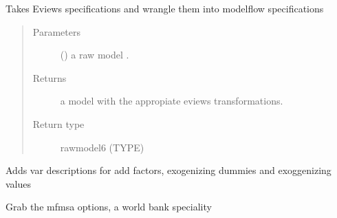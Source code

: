 \documentclass[letterpaper,10pt,english]{sphinxmanual}
\begin{document}
\begin{fulllineitems}

\begin{fulllineitems}
\label{\detokenize{onboard/modelgrabwf2:modelgrabwf2.GrabWfModel.trans_eviews}}
\pysigstartsignatures
{}
\pysigstopsignatures
\sphinxAtStartPar
Takes Eviews specifications and wrangle them into modelflow specifications
\begin{quote}\begin{description}
\item[{Parameters}] \leavevmode
\sphinxAtStartPar
{} () \textendash{} a raw model .

\item[{Returns}] \leavevmode
\sphinxAtStartPar
a model with the appropiate eviews transformations.

\item[{Return type}] \leavevmode
\sphinxAtStartPar
rawmodel6 (TYPE)

\end{description}\end{quote}

\end{fulllineitems}


\begin{fulllineitems}
\label{\detokenize{onboard/modelgrabwf2:modelgrabwf2.GrabWfModel.var_description}}
\pysigstartsignatures
{}
\pysigstopsignatures
\sphinxAtStartPar
Adds var descriptions for add factors, exogenizing dummies and exoggenizing values

\end{fulllineitems}


\begin{fulllineitems}
\label{\detokenize{onboard/modelgrabwf2:modelgrabwf2.GrabWfModel.mfmsa_options}}
\pysigstartsignatures
{}
\pysigstopsignatures
\sphinxAtStartPar
Grab the mfmsa options, a world bank speciality


\end{fulllineitems}
\end{fulllineitems}
\end{document}
